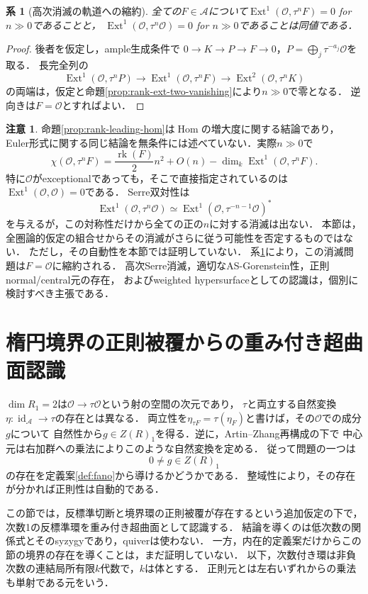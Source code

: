 \documentclass[11pt,a4paper]{ltjsarticle}
\newtheorem{corollary}[theorem]{系}
\theoremstyle{definition}
\newtheorem{remark}[theorem]{注意}
\newcommand{\OO}{\mathcal O}
\renewcommand{\AA}{\mathcal A}
\newcommand{\Hom}{\operatorname{Hom}}
\newcommand{\Ext}{\operatorname{Ext}}
\newcommand{\rk}{\operatorname{rk}}
\newcommand{\id}{\operatorname{id}}
\begin{document}
\begin{corollary}[高次消滅の軌道への縮約]\label{cor:orbit-vanishing-reduction}
全ての$F\in\AA$について$\Ext^1(\OO,\tau^nF)=0$ for $n\gg0$であることと，
$\Ext^1(\OO,\tau^n\OO)=0$ for $n\gg0$であることは同値である．
\end{corollary}
\begin{proof}
後者を仮定し，ample生成条件で
$0\to K\to P\to F\to0$，$P=\bigoplus_j\tau^{-a_j}\OO$を取る．
長完全列の
\[
 \Ext^1(\OO,\tau^nP)\longrightarrow\Ext^1(\OO,\tau^nF)
 \longrightarrow\Ext^2(\OO,\tau^nK)
\]
の両端は，仮定と命題\ref{prop:rank-ext-two-vanishing}により$n\gg0$で零となる．
逆向きは$F=\OO$とすればよい．
\end{proof}

\begin{remark}\label{rem:rank-euler-gap}
命題\ref{prop:rank-leading-hom}は$\Hom$の増大度に関する結論であり，
Euler形式に関する同じ結論を無条件には述べていない．実際$n\gg0$で
\[
 \chi(\OO,\tau^nF)
 =\frac{\rk(F)}2n^2+O(n)
   -\dim_k\Ext^1(\OO,\tau^nF).
\]
特に$\OO$がexceptionalであっても，そこで直接指定されているのは
$\Ext^1(\OO,\OO)=0$である．
Serre双対性は
\[
 \Ext^1(\OO,\tau^n\OO)
 \simeq\Ext^1(\OO,\tau^{-n-1}\OO)^*
\]
を与えるが，この対称性だけから全ての正の$n$に対する消滅は出ない．
本節は，全圏論的仮定の組合せからその消滅がさらに従う可能性を否定するものではない．
ただし，その自動性を本節では証明していない．
系\ref{cor:orbit-vanishing-reduction}により，この消滅問題は$F=\OO$に縮約される．
高次Serre消滅，適切なAS-Gorenstein性，正則normal/central元の存在，
およびweighted hypersurfaceとしての認識は，個別に検討すべき主張である．
\end{remark}


\section{楕円境界の正則被覆からの重み付き超曲面認識}
\label{sec:weighted-recognition}

$\dim R_1=2$は$\OO\to\tau\OO$という射の空間の次元であり，
$\tau$と両立する自然変換$\eta:\id_{\AA}\to\tau$の存在とは異なる．
両立性を$\eta_{\tau F}=\tau(\eta_F)$と書けば，その$\OO$での成分$g$について
自然性から$g\in Z(R)_1$を得る．逆に，Artin--Zhang再構成の下で
中心元は右加群への乗法によりこのような自然変換を定める．
従って問題の一つは
\[
 0\ne g\in Z(R)_1
\]
の存在を定義案\ref{def:fano}から導けるかどうかである．
整域性により，その存在が分かれば正則性は自動的である．

この節では，反標準切断と境界環の正則被覆が存在するという追加仮定の下で，
次数1の反標準環を重み付き超曲面として認識する．
結論を導くのは低次数の関係式とそのsyzygyであり，quiverは使わない．
一方，内在的定義案だけからこの節の境界の存在を導くことは，まだ証明していない．
以下，次数付き環は非負次数の連結局所有限$k$代数で，$k$は体とする．
正則元とは左右いずれからの乗法も単射である元をいう．
\end{document}
